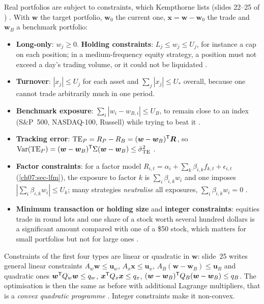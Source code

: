 \begin{paracol}{2}
Real portfolios are subject to constraints, which Kempthorne lists (slides 22--25 of )
. With $\bm w$ the target portfolio, $\bm w_0$ the current one, $\bm x=\bm w-\bm w_0$ the
trade and $\bm w_B$ a benchmark portfolio:
\begin{itemize}
  \item \textbf{Long-only}: $w_j\ge0$. \textbf{Holding constraints}: $L_j\le w_j\le U_j$, for instance a cap
        on each position; in a medium-frequency equity strategy, a position must not exceed a day's trading
        volume, or it could not be liquidated .
  \item \textbf{Turnover}: $|x_j|\le U_j$ for each asset and $\sum_j|x_j|\le U_*$ overall, because one cannot
        trade arbitrarily much in one period.
  \item \textbf{Benchmark exposure}: $\sum_i|w_i-w_{B,i}|\le U_B$, to remain close to an index (S\&P~500,
        NASDAQ-100, Russell) while trying to beat it .
  \item \textbf{Tracking error}: $\mathrm{TE}_P=R_P-R_B=(\bm w-\bm w_B)^{\mathsf T}\bm R$, so
        $\operatorname{Var}(\mathrm{TE}_P)=(\bm w-\bm w_B)^{\mathsf T}\Sigma(\bm w-\bm w_B)\le\bar\sigma^2_{\mathrm{TE}}$
        .
  \item \textbf{Factor constraints}: for a factor model $R_{i,t}=\alpha_i+\sum_k\beta_{i,k}f_{k,t}+\epsilon_{i,t}$
        (\cref{ch07:sec-lfm}), the exposure to factor $k$ is $\sum_i\beta_{i,k}w_i$ and one imposes
        $|\sum_i\beta_{i,k}w_i|\le U_k$; many strategies \emph{neutralise} all exposures, $\sum_i\beta_{i,k}w_i=0$
        .
  \item \textbf{Minimum transaction or holding size} and \textbf{integer constraints}: equities trade in round lots
        and one share of a stock worth several hundred dollars is a significant amount compared with one of a
        \$50 stock, which matters for small portfolios but not for large ones .
\end{itemize}
Constraints of the first four types are linear or quadratic in $\bm w$: slide~25 writes general linear constraints
$A_w\bm w\le\bm u_w$, $A_x\bm x\le\bm u_x$, $A_B(\bm w-\bm w_B)\le\bm u_B$ and quadratic ones $\bm w^{\mathsf T} Q_w\bm w\le q_w$,
$\bm x^{\mathsf T} Q_x\bm x\le q_x$, $(\bm w-\bm w_B)^{\mathsf T} Q_B(\bm w-\bm w_B)\le q_B$. The optimisation is then the same as before with
additional Lagrange multipliers, that is a \emph{convex quadratic programme} . Integer constraints make
it non-convex.


\end{paracol}
